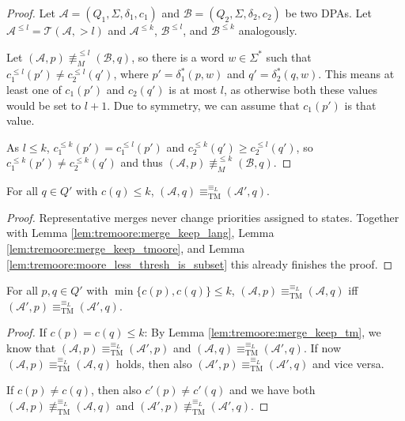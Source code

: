 \begin{proof}
	Let $\mathcal{A} = (Q_1, \Sigma, \delta_1, c_1)$ and $\mathcal{B} = (Q_2, \Sigma, \delta_2, c_2)$ be two DPAs. Let $\mathcal{A}^{\leq l} = \mathcal{T}(\mathcal{A}, > l)$ and $\mathcal{A}^{\leq k}$, $\mathcal{B}^{\leq l}$, and $\mathcal{B}^{\leq k}$ analogously.
	
	Let $(\mathcal{A}, p) \not\equiv_M^{\leq l} (\mathcal{B}, q)$, so there is a word $w \in \Sigma^*$ such that $c_1^{\leq l}(p') \neq c_2^{\leq l}(q')$, where $p' = \delta_1^*(p, w)$ and $q' = \delta_2^*(q, w)$. This means at least one of $c_1(p')$ and $c_2(q')$ is at most $l$, as otherwise both these values would be set to $l+1$. Due to symmetry, we can assume that $c_1(p')$ is that value.
	
	As $l \leq k$, $c_1^{\leq k}(p') = c_1^{\leq l}(p')$ and $c_2^{\leq k}(q') \geq c_2^{\leq l}(q')$, so $c_1^{\leq k}(p') \neq c_2^{\leq k}(q')$ and thus $(\mathcal{A}, p) \not\equiv_M^{\leq k} (\mathcal{B}, q)$.
\end{proof} 

\begin{lem}
	For all $q \in Q'$ with $c(q) \leq k$, $(\mathcal{A}, q) \equiv^{\equiv_L}_\text{TM} (\mathcal{A}', q)$.
	\label{lem:tremoore:merge_keep_tm}
\end{lem}

\begin{proof}
	Representative merges never change priorities assigned to states. Together with Lemma \ref{lem:tremoore:merge_keep_lang}, Lemma \ref{lem:tremoore:merge_keep_tmoore}, and Lemma \ref{lem:tremoore:moore_less_thresh_is_subset} this already finishes the proof.
\end{proof}

\begin{lem}
	For all $p, q \in Q'$ with $\min \{c(p), c(q)\} \leq k$, $(\mathcal{A}, p) \equiv^{\equiv_L}_\text{TM} (\mathcal{A}, q)$ iff \linebreak $(\mathcal{A}', p) \equiv^{\equiv_L}_\text{TM} (\mathcal{A}', q)$.
	\label{lem:tremoore:merge_changes_only_higher}
\end{lem}

\begin{proof}
	If $c(p) = c(q) \leq k$: By Lemma \ref{lem:tremoore:merge_keep_tm}, we know that $(\mathcal{A}, p) \equiv^{\equiv_L}_\text{TM} (\mathcal{A}', p)$ and $(\mathcal{A}, q) \equiv^{\equiv_L}_\text{TM} (\mathcal{A}', q)$. If now $(\mathcal{A}, p) \equiv^{\equiv_L}_\text{TM} (\mathcal{A}, q)$ holds, then also $(\mathcal{A}', p) \equiv^{\equiv_L}_\text{TM} (\mathcal{A}', q)$ and vice versa.
	
	If $c(p) \neq c(q)$, then also $c'(p) \neq c'(q)$ and we have both $(\mathcal{A}, p) \not\equiv^{\equiv_L}_\text{TM} (\mathcal{A}, q)$ and $(\mathcal{A}', p) \not\equiv^{\equiv_L}_\text{TM} (\mathcal{A}', q)$.
\end{proof}

